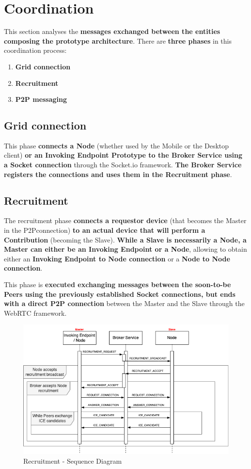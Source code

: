 \section{Coordination}\label{coordination}
This section analyses the \textbf{messages exchanged between the entities composing the prototype architecture}. There are \textbf{three phases} in this coordination process:
\begin{enumerate}
    \item \textbf{Grid connection}
    \item \textbf{Recruitment}
    \item \textbf{P2P messaging}
\end{enumerate}

\subsection{Grid connection}
This phase \textbf{connects a Node} (whether used by the Mobile or the Desktop client) \textbf{or an Invoking Endpoint Prototype to the Broker Service using a Socket connection} through the Socket.io framework. \textbf{The Broker Service registers the connections and uses them in the Recruitment phase}.

\subsection{Recruitment}
The recruitment phase \textbf{connects a requestor device} (that becomes the Master in the P2Pconnection) \textbf{to an actual device that will perform a Contribution} (becoming the Slave). \textbf{While a Slave is necessarily a Node, a Master can either be an Invoking Endpoint or a Node}, allowing to obtain either an \textbf{Invoking Endpoint to Node connection} or a \textbf{Node to Node connection}.

This phase is \textbf{executed exchanging messages between the soon-to-be Peers using the previously established Socket connections, but ends with a direct P2P connection} between the Master and the Slave through the WebRTC framework.

\begin{figure}[!ht]
    \centering
    \includegraphics[scale=0.65]{document/chapters/chapter_7/images/recruitment_messages.png}
    \caption{Recruitment - Sequence Diagram}
    \label{fig:recruitment_messages}
\end{figure}

